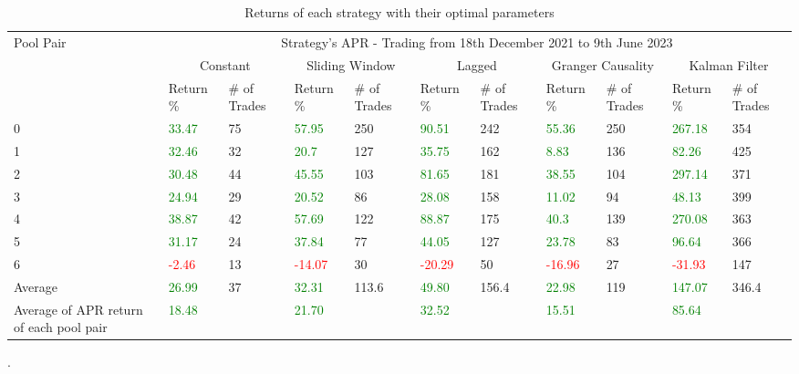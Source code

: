 \begin{table}[!htb]
    \centering
    \begin{adjustwidth}{-0.8in}{-0.9in}
        \begin{tabular}{|p{4em}|p{3em}|p{3em}|p{3em}|p{3em}|p{3em}|p{3em}|p{3em}|p{3em}|p{3em}|p{3em}|}\hline
            Pool Pair & \multicolumn{10}{|c|}{Strategy's APR - Trading from 18th December 2021 to 9th June 2023} \\\cline{2-11}
            & \multicolumn{2}{|c|}{Constant} & \multicolumn{2}{|c|}{Sliding Window} & \multicolumn{2}{|c|}{Lagged} & \multicolumn{2}{|c|}{Granger Causality} & \multicolumn{2}{|c|}{Kalman Filter}\\\cline{2-11}
            & Return \% & \# of Trades & Return \% & \# of Trades & Return \% & \# of Trades & Return \% & \# of Trades & Return \% & \# of Trades\\\hline
            0 & \textcolor{green}{33.47} & 75 & \textcolor{green}{57.95} & 250 & \textcolor{green}{90.51} & 242 & \textcolor{green}{55.36} & 250 & \textcolor{green}{267.18} & 354\\\cline{2-11}
            1 & \textcolor{green}{32.46} & 32 & \textcolor{green}{20.7} & 127 & \textcolor{green}{35.75} & 162 & \textcolor{green}{8.83} & 136 & \textcolor{green}{82.26} & 425\\\cline{2-11}
            2 & \textcolor{green}{30.48} & 44 & \textcolor{green}{45.55} & 103 & \textcolor{green}{81.65} & 181 & \textcolor{green}{38.55} & 104 & \textcolor{green}{297.14} & 371\\\cline{2-11}
            3 & \textcolor{green}{24.94} & 29 & \textcolor{green}{20.52} & 86 & \textcolor{green}{28.08} & 158 & \textcolor{green}{11.02} & 94 & \textcolor{green}{48.13} & 399\\\cline{2-11}
            4 & \textcolor{green}{38.87} & 42 & \textcolor{green}{57.69} & 122 & \textcolor{green}{88.87} & 175 & \textcolor{green}{40.3} & 139 & \textcolor{green}{270.08} & 363\\\cline{2-11}
            5 & \textcolor{green}{31.17} & 24 & \textcolor{green}{37.84} & 77 & \textcolor{green}{44.05} & 127 & \textcolor{green}{23.78} & 83 & \textcolor{green}{96.64} & 366\\\cline{2-11}
            6 & \textcolor{red}{-2.46} & 13 & \textcolor{red}{-14.07} & 30 & \textcolor{red}{-20.29} & 50 & \textcolor{red}{-16.96} & 27 & \textcolor{red}{-31.93} & 147\\\hline\hline           
            Average & \textcolor{green}{26.99} & 37 & \textcolor{green}{32.31} & 113.6 & \textcolor{green}{49.80} & 156.4 & \textcolor{green}{22.98} & 119 & \textcolor{green}{147.07} & 346.4\\\hline            
            Average of APR return of each pool pair & \textcolor{green}{18.48} &  & \textcolor{green}{21.70} &   & \textcolor{green}{32.52} &  & \textcolor{green}{15.51} &  & \textcolor{green}{85.64} & \\\hline            
        \end{tabular}
    \end{adjustwidth}
    \caption{Returns of each strategy with their optimal parameters \label{tab:FinalResults}}.
\end{table}

